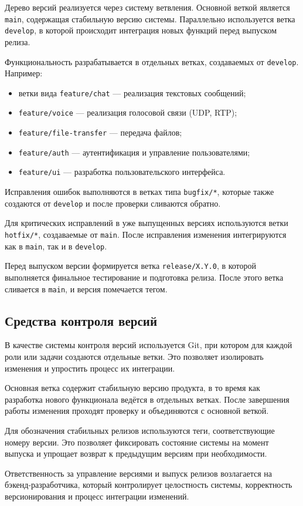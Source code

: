 \documentclass[14pt,a4paper]{extarticle}
\begin{document}
Дерево версий реализуется через систему ветвления. Основной веткой является \texttt{main}, содержащая стабильную версию системы. Параллельно используется ветка \texttt{develop}, в которой происходит интеграция новых функций перед выпуском релиза.

Функциональность разрабатывается в отдельных ветках, создаваемых от \texttt{develop}. Например:
\begin{itemize}
\item ветки вида \texttt{feature/chat} — реализация текстовых сообщений;
\item \texttt{feature/voice} — реализация голосовой связи (UDP, RTP);
\item \texttt{feature/file-transfer} — передача файлов;
\item \texttt{feature/auth} — аутентификация и управление пользователями;
\item \texttt{feature/ui} — разработка пользовательского интерфейса.
\end{itemize}

Исправления ошибок выполняются в ветках типа \texttt{bugfix/*}, которые также создаются от \texttt{develop} и после проверки сливаются обратно.

Для критических исправлений в уже выпущенных версиях используются ветки \texttt{hotfix/*}, создаваемые от \texttt{main}. После исправления изменения интегрируются как в \texttt{main}, так и в \texttt{develop}.

Перед выпуском версии формируется ветка \texttt{release/X.Y.0}, в которой выполняется финальное тестирование и подготовка релиза. После этого ветка сливается в \texttt{main}, и версия помечается тегом.

\subsection{Средства контроля версий}

В качестве системы контроля версий используется Git, при котором для каждой роли или задачи создаются отдельные ветки. Это позволяет изолировать изменения и упростить процесс их интеграции.

Основная ветка содержит стабильную версию продукта, в то время как разработка нового функционала ведётся в отдельных ветках. После завершения работы изменения проходят проверку и объединяются с основной веткой.

Для обозначения стабильных релизов используются теги, соответствующие номеру версии. Это позволяет фиксировать состояние системы на момент выпуска и упрощает возврат к предыдущим версиям при необходимости.

Ответственность за управление версиями и выпуск релизов возлагается на бэкенд-разработчика, который контролирует целостность системы, корректность версионирования и процесс интеграции изменений.
\end{document}
